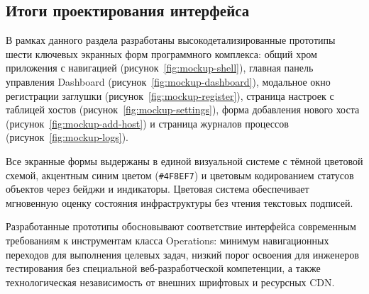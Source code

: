 

\subsection{Итоги проектирования интерфейса}

В рамках данного раздела разработаны высокодетализированные прототипы шести ключевых экранных форм программного комплекса: общий хром приложения с навигацией (рисунок~\ref{fig:mockup-shell}), главная панель управления Dashboard (рисунок~\ref{fig:mockup-dashboard}), модальное окно регистрации заглушки (рисунок~\ref{fig:mockup-register}), страница настроек с таблицей хостов (рисунок~\ref{fig:mockup-settings}), форма добавления нового хоста (рисунок~\ref{fig:mockup-add-host}) и страница журналов процессов (рисунок~\ref{fig:mockup-logs}).

Все экранные формы выдержаны в единой визуальной системе с тёмной цветовой схемой, акцентным синим цветом (\texttt{\#4F8EF7}) и цветовым кодированием статусов объектов через бейджи и индикаторы. Цветовая система обеспечивает мгновенную оценку состояния инфраструктуры без чтения текстовых подписей.

Разработанные прототипы обосновывают соответствие интерфейса современным требованиям к инструментам класса Operations: минимум навигационных переходов для выполнения целевых задач, низкий порог освоения для инженеров тестирования без специальной веб-разработческой компетенции, а также технологическая независимость от внешних шрифтовых и ресурсных CDN.
